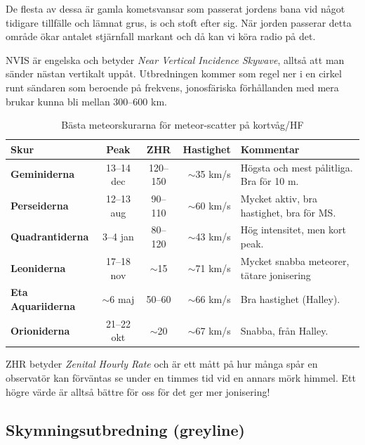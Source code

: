 De flesta av dessa är gamla kometsvansar som passerat jordens bana vid
något tidigare tillfälle och lämnat grus, is och stoft efter sig. När
jorden passerar detta område ökar antalet stjärnfall markant och då
kan vi köra radio på det.

NVIS är engelska och betyder \textit{Near Vertical Incidence Skywave},
alltså att man sänder nästan vertikalt uppåt. Utbredningen kommer som
regel ner i en cirkel runt sändaren som beroende på frekvens,
jonosfäriska förhållanden med mera brukar kunna bli mellan 300--600
km.


\begin{table}[h]
\centering
\begin{tabular}{lccrl}
\bf Skur                  & \bf Peak    & \bf ZHR  & \bf Hastighet & \bf Kommentar                             \\
\hline
\textbf{Geminiderna}      & 13--14 dec  & 120--150 & $\sim$35 km/s & Högsta och mest pålitliga. Bra för 10 m.  \\
\textbf{Perseiderna}      & 12--13 aug  & 90--110  & $\sim$60 km/s & Mycket aktiv, bra hastighet, bra för MS.  \\
\textbf{Quadrantiderna}   & 3--4 jan    & 80--120  & $\sim$43 km/s & Hög intensitet, men kort peak.            \\
\textbf{Leoniderna}       & 17--18 nov  & $\sim$15 & $\sim$71 km/s & Mycket snabba meteorer, tätare jonisering \\
\textbf{Eta Aquariiderna} & $\sim$6 maj & 50--60   & $\sim$66 km/s & Bra hastighet (Halley).                   \\
\textbf{Orioniderna}      & 21--22 okt  & $\sim$20 & $\sim$67 km/s & Snabba, från Halley.                      \\
\hline
\end{tabular}
\label{tab:Meteorskurar}
\caption{Bästa meteorskurarna för meteor-scatter på kortvåg/HF}
\end{table}

ZHR betyder {\it Zenital Hourly Rate} och är ett mått på hur många
spår en observatör kan förväntas se under en timmes tid vid en annars
mörk himmel. Ett högre värde är alltså bättre för oss för det ger mer
jonisering!

\subsection{Skymningsutbredning (greyline)}
\label{sec:greyline}

